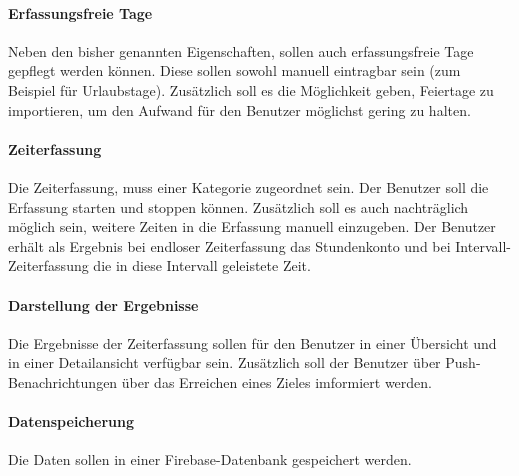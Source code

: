 \paragraph{Erfassungsfreie Tage}
Neben den bisher genannten Eigenschaften, sollen auch erfassungsfreie Tage gepflegt werden können. Diese sollen
sowohl manuell eintragbar sein (zum Beispiel für Urlaubstage). Zusätzlich soll es die Möglichkeit geben,
Feiertage zu importieren, um den Aufwand für den Benutzer möglichst gering zu halten.
\paragraph{Zeiterfassung}
Die Zeiterfassung, muss einer Kategorie zugeordnet sein. Der Benutzer soll die Erfassung starten und stoppen können.
Zusätzlich soll es auch nachträglich möglich sein, weitere Zeiten in die Erfassung manuell einzugeben.
Der Benutzer erhält als Ergebnis bei endloser Zeiterfassung das Stundenkonto und bei Intervall-Zeiterfassung die in diese Intervall geleistete Zeit.
\paragraph{Darstellung der Ergebnisse}
Die Ergebnisse der Zeiterfassung sollen für den Benutzer in einer Übersicht und in einer Detailansicht verfügbar sein.
Zusätzlich soll der Benutzer über Push-Benachrichtungen über das Erreichen eines Zieles imformiert werden.
\paragraph{Datenspeicherung}
Die Daten sollen in einer Firebase-Datenbank gespeichert werden.
